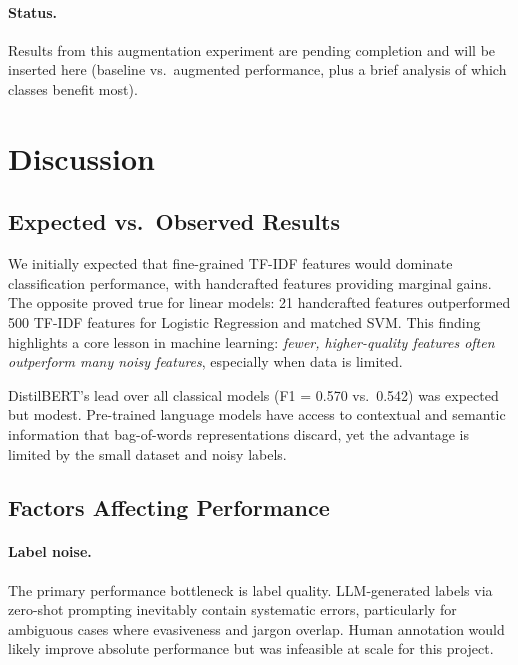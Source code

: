 \documentclass[12pt]{article}
\begin{document}
\paragraph{Status.}
Results from this augmentation experiment are pending completion and will be
inserted here (baseline vs.\ augmented performance, plus a brief analysis of
which classes benefit most).

\section{Discussion}
\label{sec:discussion}

\subsection{Expected vs.\ Observed Results}

We initially expected that fine-grained TF-IDF features would dominate
classification performance, with handcrafted features providing marginal
gains. The opposite proved true for linear models: 21 handcrafted features
outperformed 500 TF-IDF features for Logistic Regression and matched SVM.
This finding highlights a core lesson in machine learning: \emph{fewer,
higher-quality features often outperform many noisy features}, especially
when data is limited.

DistilBERT's lead over all classical models (F1 = 0.570 vs.\ 0.542)
was expected but modest. Pre-trained language models have access to
contextual and semantic information that bag-of-words representations
discard, yet the advantage is limited by the small dataset and noisy
labels.

\subsection{Factors Affecting Performance}

\paragraph{Label noise.} The primary performance bottleneck is label
quality. LLM-generated labels via zero-shot prompting inevitably
contain systematic errors, particularly for ambiguous cases where
evasiveness and jargon overlap. Human annotation would likely improve
absolute performance but was infeasible at scale for this project.
\end{document}
